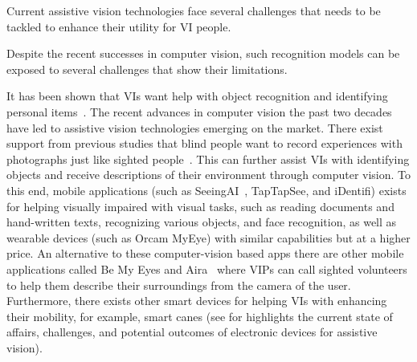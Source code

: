 Current assistive vision technologies face several challenges that needs to be tackled to enhance their utility for VI people. 



Despite the recent successes in computer vision, such recognition models can be exposed to several challenges that show their limitations. 


It has been shown that VIs want help with object recognition and identifying personal items~\cite{brady2013visual}. The recent advances in computer vision the past two decades have led to assistive vision technologies emerging on the market. There exist support from previous studies that blind people want to record experiences with photographs just like sighted people~\cite{jayant2011supporting}. This can further assist VIs with identifying objects and receive descriptions of their environment through computer vision. To this end, mobile applications (such as SeeingAI~\cite{microsoft2017seeing}, TapTapSee, and iDentifi)  exists for helping visually impaired with visual tasks, such as reading documents and hand-written texts, recognizing various objects, and face recognition, as well as wearable devices (such as Orcam MyEye) with similar capabilities but at a higher price. An alternative to these computer-vision based apps there are other mobile applications called Be My Eyes and Aira~\cite{aira2017aira} where VIPs can call sighted volunteers to help them describe their surroundings from the camera of the user. Furthermore, there exists other smart devices for helping VIs with enhancing their mobility, for example, smart canes (see \cite{manduchi2012computer} for highlights the current state of affairs, challenges, and potential outcomes of electronic devices for assistive vision). 

